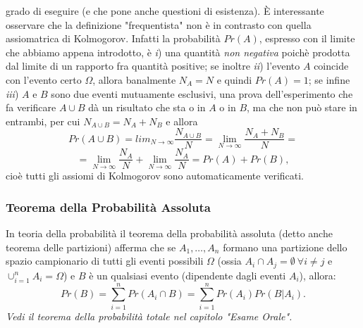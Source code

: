 \documentclass[12pt,oneside,openany]{memoir}
\numberwithin{equation}{subsection}
\begin{document}
grado di eseguire (e che pone anche questioni di esistenza).
\bigbreak
\`E interessante osservare che la definizione "frequentista" non \`e in
contrasto con quella assiomatrica di Kolmogorov. Infatti la probabilit\`a
$Pr(A)$, espresso con il limite che abbiamo appena introdotto, \`e
\textit{i}) una quantit\`a \textit{non negativa} poich\`e prodotta dal limite di
un rapporto fra quantit\`a positive; se inoltre \textit{ii}) l'evento $A$
coincide con l'evento certo $\Omega$, allora banalmente $N_A = N$ e quindi
$Pr(A) = 1$; se infine \textit{iii}) $A$ e $B$ sono due eventi mutuamente
esclusivi, una prova dell'esperimento che fa verificare $A \cup B$ d\`a un
risultato che sta o in $A$ o in $B$, ma che non pu\`o stare in entrambi, per cui
$N_{A \cup B} = N_A + N_B$ e allora
\[
    Pr(A \cup B) = lim_{N \rightarrow \infty} \frac{N_{A \cup B}}{N} =
    \lim_{N \rightarrow \infty} \frac{N_A + N_B}{N} =
\]
\[
    = \lim_{N \rightarrow \infty} \frac{N_A}{N} + \lim_{N \rightarrow \infty}
    \frac{N_A}{N} = Pr(A) + Pr(B),
\]
cio\`e tutti gli assiomi di Kolmogorov sono automaticamente verificati.


\subsubsection{Teorema della Probabilit\`a Assoluta}
In teoria della probabilit\`a il teorema della probabilit\`a assoluta (detto 
anche teorema delle partizioni) afferma che se $A_1, \dots, A_n$ formano una
partizione dello spazio campionario di tutti gli eventi possibili $\Omega$
(ossia $A_i \cap A_j = \emptyset \ \forall i \neq j$ e $\cup_{i = 1}^{n} A_i =
\Omega$) e $B$ \`e un qualsiasi evento (dipendente dagli eventi $A_i$), allora:
\begin{equation}
    Pr(B) = \sum_{i = 1}^{n} Pr(A_i \cap B) = \sum_{i = 1}^{n} Pr(A_i)
    Pr(B | A_i).
\end{equation}
\textit{Vedi il teorema della probabilit\`a totale nel capitolo "Esame Orale".}

\end{document}
